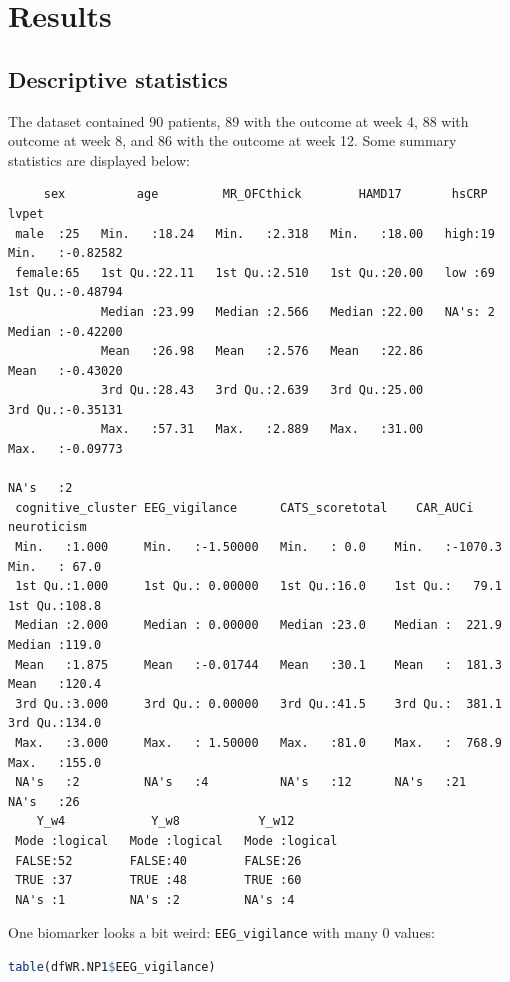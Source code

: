 \documentclass[12pt]{article}
\begin{document}
\bigskip

\clearpage
\section{Results}
\label{sec:orgb29969a}


\subsection{Descriptive statistics}
\label{sec:orgb06b678}

The dataset contained 90 patients, 89 with the outcome at week 4, 88
with outcome at week 8, and 86 with the outcome at week 12. Some
summary statistics are displayed below:
\label{}
\begin{verbatim}
     sex          age         MR_OFCthick        HAMD17       hsCRP        lvpet         
 male  :25   Min.   :18.24   Min.   :2.318   Min.   :18.00   high:19   Min.   :-0.82582  
 female:65   1st Qu.:22.11   1st Qu.:2.510   1st Qu.:20.00   low :69   1st Qu.:-0.48794  
             Median :23.99   Median :2.566   Median :22.00   NA's: 2   Median :-0.42200  
             Mean   :26.98   Mean   :2.576   Mean   :22.86             Mean   :-0.43020  
             3rd Qu.:28.43   3rd Qu.:2.639   3rd Qu.:25.00             3rd Qu.:-0.35131  
             Max.   :57.31   Max.   :2.889   Max.   :31.00             Max.   :-0.09773  
                                                                       NA's   :2         
 cognitive_cluster EEG_vigilance      CATS_scoretotal    CAR_AUCi        neuroticism   
 Min.   :1.000     Min.   :-1.50000   Min.   : 0.0    Min.   :-1070.3   Min.   : 67.0  
 1st Qu.:1.000     1st Qu.: 0.00000   1st Qu.:16.0    1st Qu.:   79.1   1st Qu.:108.8  
 Median :2.000     Median : 0.00000   Median :23.0    Median :  221.9   Median :119.0  
 Mean   :1.875     Mean   :-0.01744   Mean   :30.1    Mean   :  181.3   Mean   :120.4  
 3rd Qu.:3.000     3rd Qu.: 0.00000   3rd Qu.:41.5    3rd Qu.:  381.1   3rd Qu.:134.0  
 Max.   :3.000     Max.   : 1.50000   Max.   :81.0    Max.   :  768.9   Max.   :155.0  
 NA's   :2         NA's   :4          NA's   :12      NA's   :21        NA's   :26     
    Y_w4            Y_w8           Y_w12        
 Mode :logical   Mode :logical   Mode :logical  
 FALSE:52        FALSE:40        FALSE:26       
 TRUE :37        TRUE :48        TRUE :60       
 NA's :1         NA's :2         NA's :4
\end{verbatim}

One biomarker looks a bit weird: \texttt{EEG\_vigilance} with many 0 values:
\begin{lstlisting}[language=r,numbers=none]
table(dfWR.NP1$EEG_vigilance)
\end{lstlisting}
\end{document}
